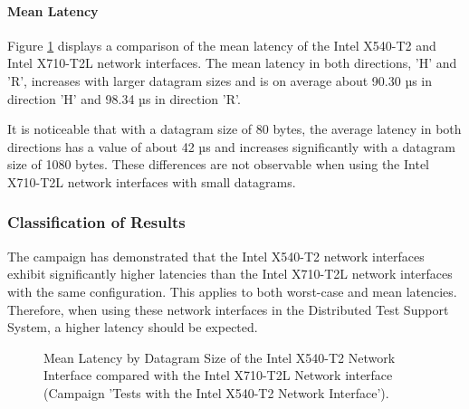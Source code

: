\paragraph{Mean Latency}

Figure \ref{fig:540Mean} displays a comparison of the mean latency of the Intel X540-T2 and Intel X710-T2L network interfaces. The mean latency in both directions, 'H' and 'R', increases with larger datagram sizes and is on average about 90.30 µs in direction 'H' and 98.34 µs in direction 'R'.

It is noticeable that with a datagram size of 80 bytes, the average latency in both directions has a value of about 42 µs and increases significantly with a datagram size of 1080 bytes. These differences are not observable when using the Intel X710-T2L network interfaces with small datagrams.

\subsubsection{Classification of Results}
The campaign has demonstrated that the Intel X540-T2 network interfaces exhibit significantly higher latencies than the Intel X710-T2L network interfaces with the same configuration. This applies to both worst-case and mean latencies. Therefore, when using these network interfaces in the Distributed Test Support System, a higher latency should be expected. \\

\begin{figure}[h!]
  \centering
  \caption{Mean Latency by Datagram Size of the Intel X540-T2 Network Interface compared with the Intel X710-T2L Network interface (Campaign 'Tests with the Intel X540-T2 Network Interface').}
  \label{fig:540Mean}
\end{figure}

